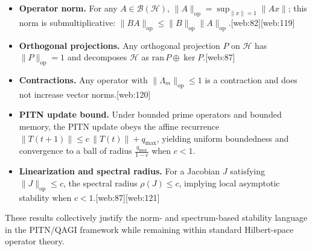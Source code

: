 \documentclass[11pt]{article}
\begin{document}
\begin{itemize}[leftmargin=*]
  \item \textbf{Operator norm.} For any \( A \in \mathcal{B}(\mathcal{H}) \), \( \|A\|_{\mathrm{op}} = \sup_{\|x\|=1} \|Ax\| \); this norm is submultiplicative: \( \|BA\|_{\mathrm{op}} \le \|B\|_{\mathrm{op}}\|A\|_{\mathrm{op}} \).[web:82][web:119]
  \item \textbf{Orthogonal projections.} Any orthogonal projection \( P \) on \( \mathcal{H} \) has \( \|P\|_{\mathrm{op}} = 1 \) and decomposes \( \mathcal{H} \) as \( \mathrm{ran}\,P \oplus \ker P \).[web:87]
  \item \textbf{Contractions.} Any operator with \( \|\Lambda_m\|_{\mathrm{op}} \le 1 \) is a contraction and does not increase vector norms.[web:120]
  \item \textbf{PITN update bound.} Under bounded prime operators and bounded memory, the PITN update obeys the affine recurrence \( \|T(t+1)\| \le c\,\|T(t)\| + q_{\max} \), yielding uniform boundedness and convergence to a ball of radius \( \frac{q_{\max}}{1-c} \) when \( c < 1 \).
  \item \textbf{Linearization and spectral radius.} For a Jacobian \( J \) satisfying \( \|J\|_{\mathrm{op}} \le c \), the spectral radius \( \rho(J) \le c \), implying local asymptotic stability when \( c<1 \).[web:87][web:121]
\end{itemize}

These results collectively justify the norm- and spectrum-based stability language in the PITN/QAGI framework while remaining within standard Hilbert-space operator theory.

\nocite{*}
  

\end{document}
